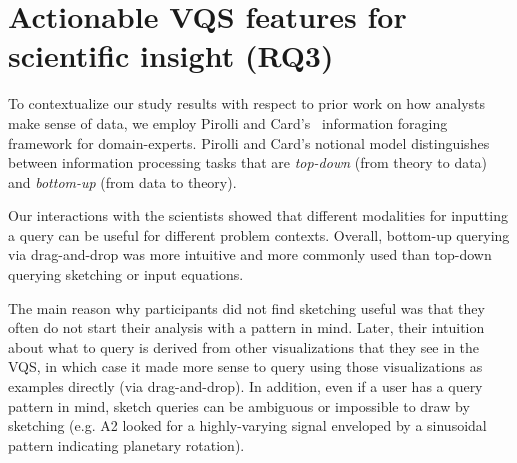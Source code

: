 \section{Actionable VQS features for scientific insight (RQ3)} \label{VQS_features_discussion}
To contextualize our study results with respect to prior work on how analysts make sense of data, we employ Pirolli and Card's~\cite{Pirolli} information foraging framework for domain-experts. Pirolli and Card's notional model distinguishes between information processing tasks that are \textit{top-down} (from theory to data) and \textit{bottom-up} (from data to theory). 
\par Our interactions with the scientists showed that different modalities for inputting a query can be useful for different problem contexts.  Overall,  bottom-up querying via drag-and-drop was more intuitive and more commonly used than top-down querying  sketching or input equations.
\par The main reason why participants did not find sketching useful was that they often do not start their analysis with a pattern in mind. Later, their intuition about what to query is derived from other visualizations that they see in the VQS, in which case it made more sense to query using those visualizations as examples directly (via drag-and-drop). In addition, even if a user has a query pattern in mind, sketch queries can be ambiguous \cite{correll2016semantics} or impossible to draw by sketching (e.g. A2 looked for a highly-varying signal enveloped by a sinusoidal pattern indicating planetary rotation).
